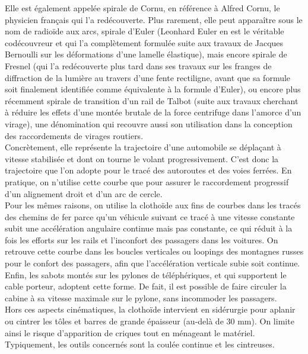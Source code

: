 \documentclass[a4paper,11pt]{book}
\begin{document}
Elle est \'egalement appel\'ee spirale de Cornu, en r\'ef\'erence \`a Alfred 
Cornu, le physicien fran\c{c}ais qui l'a red\'ecouverte. Plus rarement, elle 
peut apparaître sous le nom de radio\"{i}de aux arcs, spirale d'Euler 
(Leonhard Euler en est le v\'eritable cod\'ecouvreur et qui l'a compl\`etement 
formul\'ee suite aux travaux de Jacques Bernoulli sur les d\'eformations d'une 
lamelle \'elastique), mais encore spirale de Fresnel (qui l'a red\'ecouverte 
plus tard dans ses travaux sur les franges de diffraction de la lumi\`ere au 
travers d'une fente rectiligne, avant que sa formule soit finalement 
identifi\'ee comme \'equivalente \`a la formule d'Euler), ou encore plus 
r\'ecemment spirale de transition d'un rail de Talbot (suite aux travaux 
cherchant \`a r\'eduire les effets d'une mont\'ee brutale de la force 
centrifuge dans l'amorce d'un virage), une d\'enomination qui recouvre aussi 
son utilisation dans la conception des raccordements de virages routiers.\\
Concr\`etement, elle repr\'esente la trajectoire d'une automobile se 
d\'epla\c{c}ant \`a vitesse stabilis\'ee et dont on tourne le volant 
progressivement. C'est donc la trajectoire que l'on adopte pour le trac\'e des 
autoroutes et des voies ferr\'ees. En pratique, on n'utilise cette courbe que 
pour assurer le raccordement progressif d'un alignement droit et d'un arc de 
cercle. \\
Pour les m\^emes raisons, on utilise la clotho\"{i}de aux fins de courbes dans
les trac\'es des chemins de fer parce qu'un v\'ehicule suivant ce trac\'e \`a 
une vitesse constante subit une acc\'el\'eration angulaire continue mais pas 
constante, ce qui r\'eduit \`a la fois les efforts sur les rails et l'inconfort
 des passagers dans les voitures. On retrouve cette courbe dans les boucles 
verticales ou loopings des montagnes russes pour le confort des passagers, afin 
que l'acc\'el\'eration verticale subie soit continue.\\
Enfin, les sabots mont\'es sur les pylones de t\'el\'eph\'eriques, et qui 
supportent le cable porteur, adoptent cette forme. De fait, il est possible de 
faire circuler la cabine \`a sa vitesse maximale sur le pylone, sans incommoder
 les passagers.\\
Hors ces aspects cin\'ematiques, la clotho\"{i}de intervient en sid\'erurgie 
pour aplanir ou cintrer les t\^oles et barres de grande \'epaisseur (au-del\`a 
de 30 mm). On limite ainsi le risque d'apparition de criques tout en m\'enageant
le mat\'eriel. Typiquement, les outils concern\'es sont la coul\'ee continue et
les cintreuses.
\end{document}
